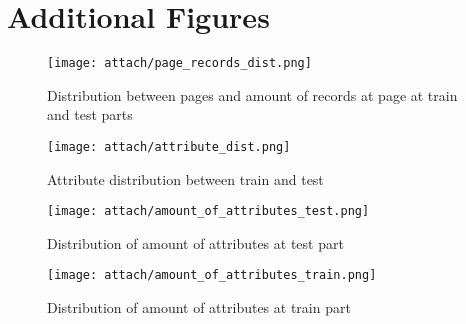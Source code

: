\section*{Additional Figures}
\begin{figure}[H]
    \centering
    \texttt{[image: attach/page\_records\_dist.png]}
    \caption{Distribution between pages and amount of records at page at train and test parts}
    \label{fig:page_records_dist}
\end{figure}

\begin{figure}[H]
    \centering
    \texttt{[image: attach/attribute\_dist.png]}
    \caption{Attribute distribution between train and test}
    \label{fig:attribute_dist}
\end{figure}

\begin{figure}[H]
    \centering
    \texttt{[image: attach/amount\_of\_attributes\_test.png]}
    \caption{Distribution of amount of attributes at test part}
    \label{fig:amount_of_attributes_test}
\end{figure}

\begin{figure}[H]
    \centering
    \texttt{[image: attach/amount\_of\_attributes\_train.png]}
    \caption{Distribution of amount of attributes at train part}
    \label{fig:amount_of_attributes_train}
\end{figure}